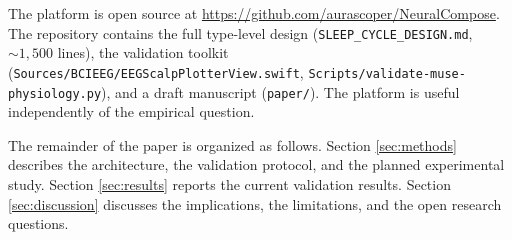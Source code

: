 The platform is open source at \url{https://github.com/aurascoper/NeuralCompose}.
The repository contains the full type-level design
(\texttt{SLEEP\_CYCLE\_DESIGN.md}, $\sim 1{,}500$ lines), the validation
toolkit (\texttt{Sources/BCIEEG/EEGScalpPlotterView.swift},
\texttt{Scripts/validate-muse-physiology.py}), and a draft manuscript
(\texttt{paper/}). The platform is useful independently of the empirical
question.

The remainder of the paper is organized as follows. Section
\ref{sec:methods} describes the architecture, the validation protocol, and
the planned experimental study. Section \ref{sec:results} reports the
current validation results. Section \ref{sec:discussion} discusses the
implications, the limitations, and the open research questions.
